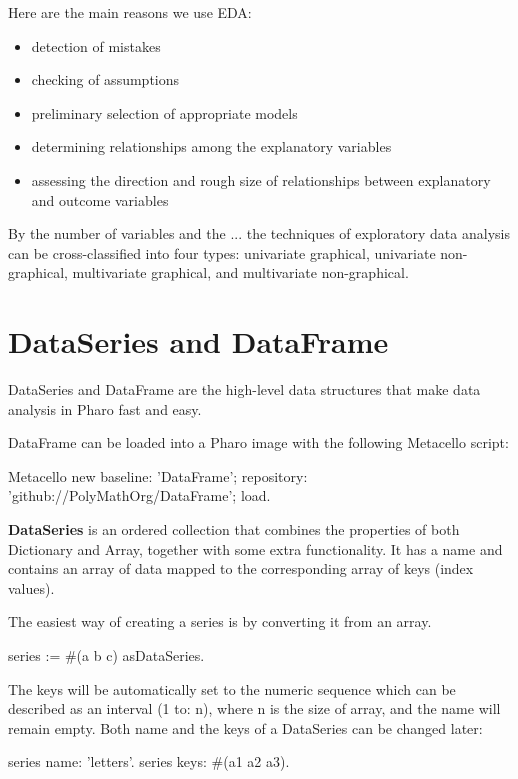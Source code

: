 \documentclass{article}
\begin{document}
\begin{multicols}{2}
Here are the main reasons we use EDA:
\begin{itemize}
  \item detection of mistakes
  \item checking of assumptions
  \item preliminary selection of appropriate models
  \item determining relationships among the explanatory variables
  \item assessing the direction and rough size of relationships between explanatory and outcome variables
\end{itemize}

By the number of variables and the ... the techniques of exploratory data analysis can be cross-classified into four types: univariate graphical, univariate non-graphical, multivariate graphical, and multivariate non-graphical.

\section{DataSeries and DataFrame}
\label{sec:dataframe}
DataSeries and DataFrame are the high-level data structures that make data analysis in Pharo fast and easy.
\cite{McKinney}

DataFrame can be loaded into a Pharo image with the following Metacello script:
\begin{code}{}
Metacello new
  baseline: 'DataFrame';
  repository: 'github://PolyMathOrg/DataFrame';
  load.
\end{code}

\textbf{DataSeries} is an ordered collection that combines the properties of both Dictionary and Array, together with some extra functionality. It has a name and contains an array of data mapped to the corresponding array of keys (index values).

The easiest way of creating a series is by converting it from an array. 

\begin{code}{}
series := #(a b c) asDataSeries.
\end{code}

The keys will be automatically set to the numeric sequence which can be described as an interval (1 to: n), where n is the size of array, and the name will remain empty. Both name and the keys of a DataSeries can be changed later:

\begin{code}{}
series name: 'letters'.
series keys: #(a1 a2 a3).
\end{code}


\end{multicols}
\end{document}
